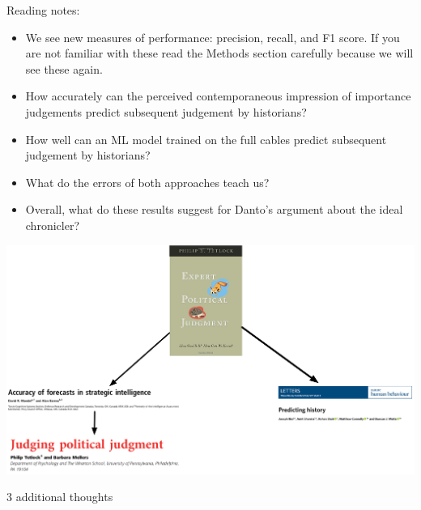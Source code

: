 \documentclass[aspectratio=169]{beamer}
\begin{document}
\begin{frame}

Reading notes:
\begin{itemize}
\item We see new measures of performance: precision, recall, and F1 score. If you are not familiar with these read the Methods section carefully because we will see these again.
\pause
\item How accurately can the perceived contemporaneous impression of importance judgements predict subsequent judgement by historians?
\pause
\item How well can an ML model trained on the full cables predict subsequent judgement by historians?
\pause
\item What do the errors of both approaches teach us?
\pause 
\item Overall, what do these results suggest for Danto's argument about the ideal chronicler?
\end{itemize}

\end{frame}
\begin{frame}

\begin{center}
\includegraphics[height=0.6\textheight]{figures/geopolitical_ideamap}
\end{center}

\end{frame}
\begin{frame}

\begin{center}
\LARGE{3 additional thoughts}
\end{center}

\end{frame}
\end{document}
